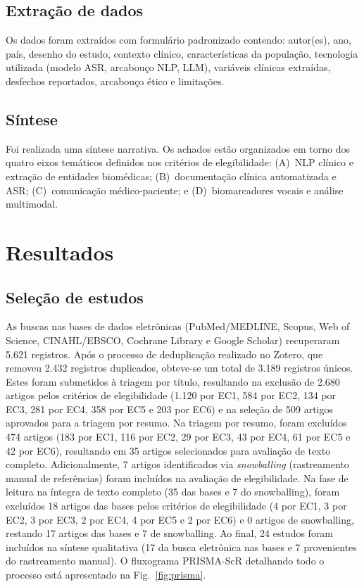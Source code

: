 \documentclass[a4paper,fleqn]{cas-sc}
\begin{document}
\subsection{Extração de dados}

Os dados foram extraídos com formulário padronizado contendo: autor(es), ano,
país, desenho do estudo, contexto clínico, características da população,
tecnologia utilizada (modelo ASR, arcabouço NLP, LLM), variáveis clínicas
extraídas, desfechos reportados, arcabouço ético e limitações.

\subsection{Síntese}

Foi realizada uma síntese narrativa. Os achados estão organizados em torno
dos quatro eixos temáticos definidos nos critérios de elegibilidade:
(A)~NLP clínico e extração de entidades biomédicas;
(B)~documentação clínica automatizada e ASR;
(C)~comunicação médico-paciente; e
(D)~biomarcadores vocais e análise multimodal.

\section{Resultados}
\label{sec:resultados}

\subsection{Seleção de estudos}

As buscas nas bases de dados eletrônicas (PubMed/MEDLINE, Scopus, Web of Science, CINAHL/EBSCO, Cochrane Library e Google Scholar) recuperaram 5.621 registros. Após o processo de deduplicação realizado no Zotero, que removeu 2.432 registros duplicados, obteve-se um total de 3.189 registros únicos. Estes foram submetidos à triagem por título, resultando na exclusão de 2.680 artigos pelos critérios de elegibilidade (1.120 por EC1, 584 por EC2, 134 por EC3, 281 por EC4, 358 por EC5 e 203 por EC6) e na seleção de 509 artigos aprovados para a triagem por resumo. Na triagem por resumo, foram excluídos 474 artigos (183 por EC1, 116 por EC2, 29 por EC3, 43 por EC4, 61 por EC5 e 42 por EC6), resultando em 35 artigos selecionados para avaliação de texto completo. Adicionalmente, 7 artigos identificados via \textit{snowballing} (rastreamento manual de referências) foram incluídos na avaliação de elegibilidade. Na fase de leitura na íntegra de texto completo (35 das bases e 7 do snowballing), foram excluídos 18 artigos das bases pelos critérios de elegibilidade (4 por EC1, 3 por EC2, 3 por EC3, 2 por EC4, 4 por EC5 e 2 por EC6) e 0 artigos de snowballing, restando 17 artigos das bases e 7 de snowballing. Ao final, 24 estudos foram incluídos na síntese qualitativa (17 da busca eletrônica nas bases e 7 provenientes do rastreamento manual). O fluxograma PRISMA-ScR detalhando todo o processo está apresentado na Fig.~\ref{fig:prisma}.
\end{document}
